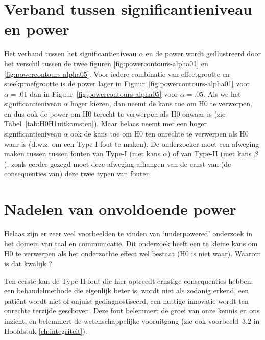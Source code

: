 \documentclass[
]{book}
\begin{document}
\hypertarget{sec:significantieniveau-power}{%
\section{Verband tussen significantieniveau en power}\label{sec:significantieniveau-power}}

Het verband tussen het significantieniveau \(\alpha\) en de power wordt
geïllustreerd door het verschil tussen de twee figuren
\ref{fig:powercontours-alpha01} en
\ref{fig:powercontours-alpha05}. Voor iedere combinatie van
effectgrootte en steekproefgrootte is de power lager in
Figuur~\ref{fig:powercontours-alpha01} voor \(\alpha=.01\) dan in
Figuur~\ref{fig:powercontours-alpha05} voor \(\alpha=.05\). Als we het
significantieniveau \(\alpha\) hoger kiezen, dan neemt de kans toe om H0
te verwerpen, en dus ook de power om H0 terecht te verwerpen als H0
onwaar is (zie
Tabel~\ref{tab:H0H1uitkomsten}). Maar helaas neemt met een hoger
significantieniveau \(\alpha\) ook de kans toe om H0 ten onrechte te
verwerpen als H0 waar is (d.w.z. om een Type-I-fout te maken). De
onderzoeker moet een afweging maken tussen tussen fouten van Type-I (met
kans \(\alpha\)) of van Type-II (met kans \(\beta\)); zoals eerder gezegd
moet deze afweging afhangen van de ernst van (de consequenties van) deze
twee typen van fouten.

\hypertarget{nadelen-van-onvoldoende-power}{%
\section{Nadelen van onvoldoende power}\label{nadelen-van-onvoldoende-power}}

Helaas zijn er zeer veel voorbeelden te vinden van `underpowered'
onderzoek in het domein van taal en communicatie. Dit onderzoek heeft
een te kleine kans om H0 te verwerpen als het onderzochte effect wel
bestaat (H0 is niet waar). Waarom is dat kwalijk \citep{Quene10}?

Ten eerste kan de Type-II-fout die hier optreedt ernstige consequenties
hebben: een behandelmethode die eigenlijk beter is, wordt niet als
zodanig erkend, een patiënt wordt niet of onjuist gediagnostiseerd, een
nuttige innovatie wordt ten onrechte terzijde geschoven. Deze fout
belemmert de groei van onze kennis en ons inzicht, en belemmert de
wetenschappelijke vooruitgang (zie ook
voorbeeld~3.2 in Hoofdstuk \ref{ch:integriteit}).
\end{document}

